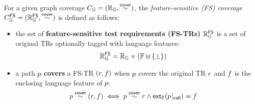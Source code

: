 \begin{definition}\label{def:fs-cov}
  For a given graph coverage $C_{\mathbb{G}} = (\mathbb{R}_{\mathbb{G}}, \overset{\textsf{cover}}{\sim})$, the
  \textit{feature-sensitive (FS) coverage} $C_{\mathbb{G}}^{\textsf{FS}} = (\mathbb{R}_{\mathbb{G}}^{\textsf{FS}},
  \overset{\textsf{cover}}{\sim})$ is defined as follows:
  \begin{itemize}
    \item the set of \textbf{feature-sensitive test requirements (FS-TRs)}
      $\mathbb{R}_{\mathbb{G}}^{\textsf{FS}}$ is a set of original TRs optionally tagged with language
      features:
      \[
        \mathbb{R}_{\mathbb{G}}^{\textsf{FS}} = \mathbb{R}_{\mathbb{G}} \times (\mathbb{F} \uplus \{ \bot \})
      \]
    \item a path $p$ \textbf{covers} a FS-TR $(r, f)$ when $p$
      covers the original TR $r$ and $f$ is the enclosing language feature
      of $p$:
      \[
        p \overset{\textsf{cover}}{\sim} (r, f) \iff p \overset{\textsf{cover}}{\sim} r \wedge
        \textsf{ext}_{\mathbb{F}}({p}\!\mid_{\textsf{call}}) = f
      \]
  \end{itemize}
\end{definition}


